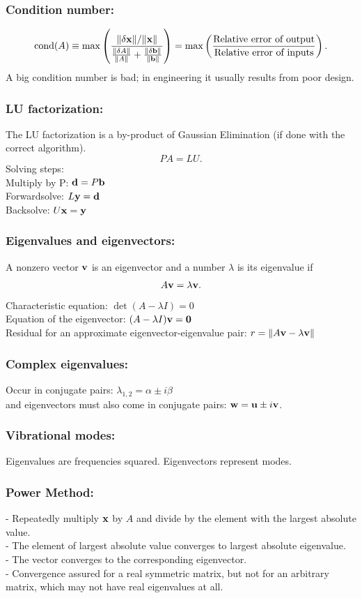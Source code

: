 \subsubsection*{Condition number:}
$$
      \textrm{cond}(A) \equiv \max \left( \frac{ \|\delta \mathbf{x}\|/\|\mathbf{x}\|}
         { \frac{\|\delta A\|}{\|A\|} + \frac{\|\delta \mathbf{b}\|}{\|\mathbf{b}\|} } \right)
          = \max \left( \frac{\text{Relative error of output}}
                             {\text{Relative error of inputs}} \right).
$$
A big condition number is bad; in engineering it usually results from poor design.


\subsubsection*{LU factorization:}
The LU factorization is a by-product of Gaussian Elimination (if done with
the correct algorithm).
$$
   PA = LU.
$$
Solving steps:\\
Multiply by P: $\mathbf{d}= P \mathbf{b}$ \\
Forwardsolve: $  L \mathbf{y} = \mathbf{d} $ \\
Backsolve: $  U \mathbf{x} = \mathbf{y} $


\subsubsection*{Eigenvalues and eigenvectors:}
A  nonzero vector $\mathbf{v}$ is an eigenvector
and a number $\lambda$ is its eigenvalue if
$$
   A \mathbf{v} = \lambda \mathbf{v}.
$$
Characteristic equation: $ \det(A - \lambda I) = 0 $  \\
Equation of the eigenvector: $(A - \lambda I) \mathbf{v} = \mathbf{0}$\\
Residual for an approximate eigenvector-eigenvalue pair: $ r  = \| A \mathbf{v}  - \lambda \mathbf{v} \|$


\subsubsection*{Complex eigenvalues:}
Occur in conjugate pairs: $ \lambda_{1,2} = \alpha \pm i \beta $\\
and  eigenvectors must also come
in conjugate pairs: $\mathbf{w} = \mathbf{u} \pm i \mathbf{v}$.

\subsubsection*{Vibrational modes:}
Eigenvalues are frequencies squared. Eigenvectors represent modes.

\subsubsection*{Power Method:}
- Repeatedly multiply $\mathbf{x}$ by $A$ and
  divide by the element with the largest absolute value.\\
- The element of largest absolute value converges to largest absolute eigenvalue.\\
- The vector converges to the corresponding eigenvector.\\
- Convergence assured for a real symmetric matrix, but not for an arbitrary
matrix, which may not have real eigenvalues at all.


